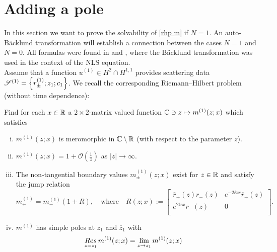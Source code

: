 \section{Adding a pole}\label{s adding a pole}
In this section we want to prove the solvability of \rh \ref{rhp m} if $N=1$. An auto-B\"{a}cklund transformation will establish a connection between the cases $N=1$ and $N=0$. All formulas were found in \cite{Deift2011} and \cite{Cuccagna2014}, where the B\"{a}cklund transformation was used in the context of the NLS equation. \\
Assume that a function $u^{(1)}\in H^2\cap H^{1,1}$ provides scattering data $\mathcal{S}^{(1)}=\left\{r^{(1)}_{\pm};z_1;c_1\right\}$. We recall the corresponding Riemann--Hilbert problem (without time dependence):
\begin{samepage}
\begin{framed}
    \begin{rhp}\label{rhp m^1}
        Find for each $x\in\mathbb R$ a $2\times 2$-matrix valued function $\mathbb C\ni z\mapsto m^{(1)}(z;x)$ which satisfies
        \begin{enumerate}[(i)]
          \item $m^{(1)}(z;x)$ is meromorphic in $\mathbb C\setminus\mathbb R$ (with respect to the parameter $z$).
          \item $m^{(1)}(z;x)=1+\mathcal{O}\left(\frac{1}{z}\right)$ as $|z|\to\infty$.
          \item The non-tangential boundary values $m^{(1)}_{\pm}(z;x)$ exist for $z\in\mathbb R$ and satisfy the jump relation
              \begin{equation}\label{e jump m^1}
                  m^{(1)}_+=m^{(1)}_-(1+R), \quad\text{where}\quad
                  R(z;x):=
                  \left[
                    \begin{array}{cc}
                       \overline{r}_+(z)r_-(z) & e^{-2\ii zx}\overline{r}_+(z) \\
                       e^{2\ii zx}r_-(z) & 0 \\
                    \end{array}
                  \right].
              \end{equation}
          \item $m^{(1)}$ has simple poles at $z_1$ and $\overline{z}_1$ with
              \begin{equation}\label{e Res m^1}
                  \begin{aligned}
                     \res_{z=z_1}m^{(1)}(z;x)&=\lim_{z\to z_1}m^{(1)}(z;x)

\end{aligned}
\end{equation}
\end{enumerate}
\end{rhp}
\end{framed}
\end{samepage}
